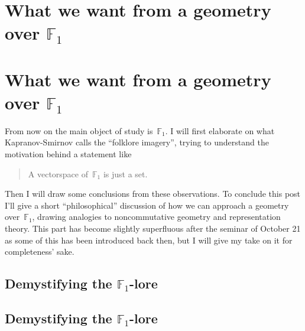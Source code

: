 \iftex
\section[What we want from a geometry over F\_1]{What we want from a geometry over $\mathbb{F}_1$}
\fi
\ifblog
\section{What we want from a geometry over $\mathbb{F}_1$}
\fi

From now on the main object of study is~$\mathbb{F}_1$. I will first elaborate on what Kapranov-Smirnov calls the ``folklore imagery'', trying to understand the motivation behind a statement like

\begin{quote}
  A vectorspace of~$\mathbb{F}_1$ is just a set.
\end{quote}

Then I will draw some conclusions from these observations. To conclude this post I'll give a short ``philosophical'' discussion of how we can approach a geometry over~$\mathbb{F}_1$, drawing analogies to noncommutative geometry and representation theory. This part has become slightly superfluous after the seminar of October 21 as some of this has been introduced back then, but I will give my take on it for completeness' sake.


\iftex
\subsection[Demystifying the F\_1-lore]{Demystifying the $\mathbb{F}_1$-lore}
\fi
\ifblog
\subsection{Demystifying the $\mathbb{F}_1$-lore}
\fi
